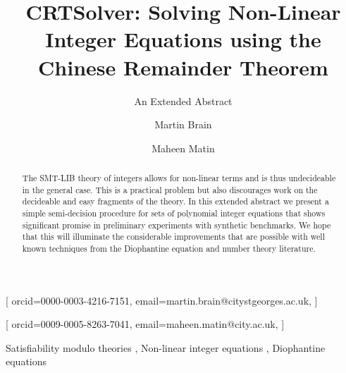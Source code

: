 \documentclass[
]{ceurart}
\begin{document}


\title{CRTSolver: Solving Non-Linear Integer Equations using the Chinese Remainder Theorem}
\subtitle{An Extended Abstract}


\author[1]{Martin Brain}[%
orcid=0000-0003-4216-7151,
email=martin.brain@citystgeorges.ac.uk,
]
\address[1]{City St. George's, University of London,
  Northampton Square, London, EC1V 0HB, United Kingdom}

\author[1]{Maheen Matin}[%
orcid=0009-0005-8263-7041,
email=maheen.matin@city.ac.uk,
]


\begin{abstract}
 The SMT-LIB theory of integers allows for non-linear terms and is thus
 undecideable in the general case.
 This is a practical problem but also discourages work on
 the decideable and easy fragments of the theory.
 In this extended abstract we present a simple semi-decision procedure
 for sets of polynomial integer equations that shows significant promise
 in preliminary experiments with synthetic benchmarks.
 We hope that this will illuminate the considerable improvements that
 are possible with well known techniques from the Diophantine equation and
 number theory literature.
\end{abstract}

\begin{keywords}
  Satisfiability modulo theories \sep
  Non-linear integer equations \sep
  Diophantine equations
\end{keywords}

\maketitle
\end{document}
